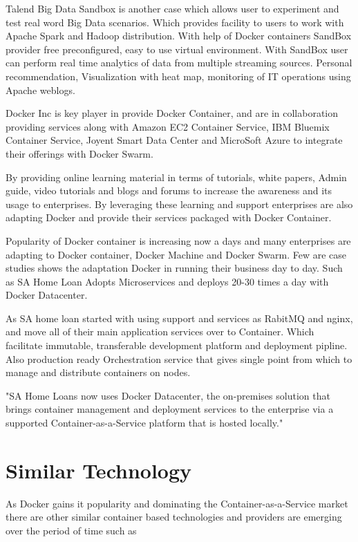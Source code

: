 \documentclass[9pt,twocolumn,twoside]{../../styles/osajnl}
\begin{document}
Talend Big Data Sandbox is another case which allows user to experiment and test real word Big Data scenarios. Which provides facility to users to work with Apache Spark and Hadoop distribution. With help of Docker containers SandBox provider free preconfigured, easy to use virtual environment. With SandBox user can perform real time analytics of data from multiple streaming sources. Personal recommendation, Visualization with heat map, monitoring of IT operations using Apache weblogs.\cite{SandBox}

Docker Inc is key player in provide Docker Container, and are in collaboration providing services along with Amazon EC2 Container Service, IBM Bluemix Container Service, Joyent Smart Data Center and MicroSoft Azure to integrate their offerings with Docker Swarm.

By providing online learning material in terms of tutorials, white papers, Admin guide, video tutorials and blogs and forums to increase the awareness and its usage to enterprises. By leveraging these learning and support enterprises are also adapting Docker and provide their services packaged with Docker Container. 

Popularity of Docker container is increasing now a days and many enterprises are adapting to Docker container, Docker Machine and Docker Swarm. Few are case studies shows the adaptation Docker in running their business day to day. Such as SA Home Loan Adopts Microservices and deploys 20-30 times a day with Docker Datacenter.

As SA home loan started with using support and services as RabitMQ and nginx, and move all of their main application services over to Container. Which facilitate immutable, transferable development platform and deployment pipline. Also production ready Orchestration service that gives single point from which to manage and distribute containers on nodes.

"SA Home Loans now uses Docker Datacenter, the on-premises solution that brings container management and deployment services to the enterprise via a supported Container-as-a-Service platform that is hosted locally."
\cite{SA}

\section{Similar Technology}
As Docker gains it popularity and dominating the Container-as-a-Service market there are other similar container based technologies and providers are emerging over the period of time such as
\end{document}

